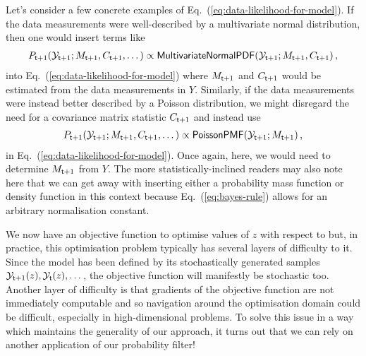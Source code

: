 Let's consider a few concrete examples of Eq.~(\ref{eq:data-likelihood-for-model}). If the data measurements were well-described by a multivariate normal distribution, then one would insert terms like
\begin{align}
P_{{\sf t}+1}({\cal Y}_{{\sf t}+1};M_{{\sf t}+1},C_{{\sf t}+1},\dots ) \propto {\sf MultivariateNormalPDF}({\cal Y}_{{\sf t}+1};M_{{\sf t}+1},C_{{\sf t}+1})\,,
\end{align}
into Eq.~(\ref{eq:data-likelihood-for-model}) where $M_{{\sf t}+1}$ and $C_{{\sf t}+1}$ would be estimated from the data measurements in $Y$. Similarly, if the data measurements were instead better described by a Poisson distribution, we might disregard the need for a covariance matrix statistic $C_{{\sf t}+1}$ and instead use
\begin{align}
P_{{\sf t}+1}({\cal Y}_{{\sf t}+1};M_{{\sf t}+1},C_{{\sf t}+1},\dots ) \propto {\sf PoissonPMF}({\cal Y}_{{\sf t}+1};M_{{\sf t}+1})\,,
\end{align}
in Eq.~(\ref{eq:data-likelihood-for-model}). Once again, here, we would need to determine $M_{{\sf t}+1}$ from $Y$. The more statistically-inclined readers may also note here that we can get away with inserting either a probability mass function or density function in this context because Eq.~(\ref{eq:bayes-rule}) allows for an arbitrary normalisation constant.

We now have an objective function to optimise values of $z$ with respect to but, in practice, this optimisation problem typically has several layers of difficulty to it. Since the model has been defined by its stochastically generated samples ${\cal Y}_{{\sf t}+1}(z), {\cal Y}_{{\sf t}}(z), \dots$, the objective function will manifestly be stochastic too. Another layer of difficulty is that gradients of the objective function are not immediately computable and so navigation around the optimisation domain could be difficult, especially in high-dimensional problems. To solve this issue in a way which maintains the generality of our approach, it turns out that we can rely on another application of our probability filter!

